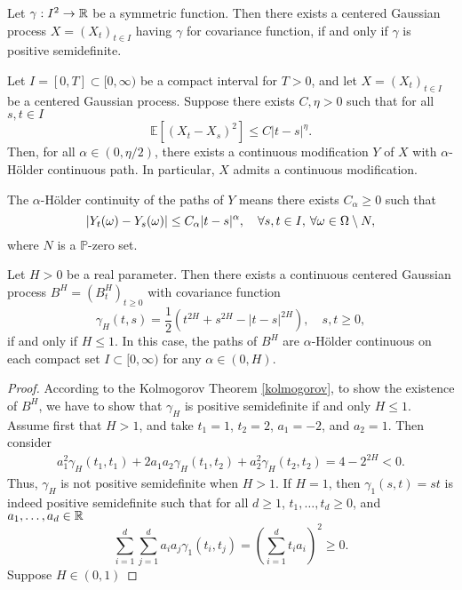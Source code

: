 \begin{thm}\label{kolmogorov}
    Let $\gamma: I^{2}\to\mathbb{R}$ be a symmetric function. Then there exists a centered Gaussian process $X=(X_{t})_{t\in I}$ having $\gamma$ for covariance function, if and only if $\gamma$ is positive semidefinite.
\end{thm}
\begin{lem}
    Let $I=[0,T]\subset [0,\infty)$ be a compact interval for $T>0$, and let $X=(X_{t})_{t\in I}$ be a centered Gaussian process. Suppose there exists $C,\eta>0$ such that for all $s,t\in I$
    \begin{equation}
        \mathbb{E}\left[(X_{t}-X_{s})^{2}\right]\leq C|t-s|^{\eta}.
    \end{equation}
    Then, for all $\alpha\in (0,\eta/2)$, there exists a continuous modification $Y$ of $X$ with $\alpha$-Hölder continuous path. In particular, $X$ admits a continuous modification.
\end{lem}
The $\alpha$-Hölder continuity of the paths of $Y$ means there exists $C_{\alpha}\geq 0$ such that
\begin{equation}
    |Y_{t}(\omega)-Y_{s}(\omega)|\leq C_{\alpha}|t-s|^{\alpha},\quad \forall s,t\in I,\hspace{2 pt}\forall\omega\in\Omega\setminus N,
\end{equation}
where $N$ is a $\mathbb{P}$-zero set.
\begin{thm}
  Let $H>0$ be a real parameter. Then there exists a continuous centered Gaussian process $B^{H}=(B_{t}^{H})_{t\geq 0}$ with covariance function
  \begin{equation}
      \gamma_{H}(t,s)=\frac{1}{2}(t^{2H}+s^{2H}-|t-s|^{2H}), \quad s,t\geq 0,
  \end{equation}
  if and only if $H\leq 1$. In this case, the paths of $B^{H}$ are $\alpha$-Hölder continuous on each compact set $I\subset [0,\infty)$ for any $\alpha\in (0,H)$.
\end{thm}
\begin{proof}
    According to the Kolmogorov Theorem \ref{kolmogorov}, to show the existence of $B^{H}$, we have to show that $\gamma_{H}$ is positive semidefinite if and only $H\leq 1$.
    Assume first that $H>1$, and take $t_{1}=1$, $t_{2}=2$, $a_{1}=-2$, and $a_{2}=1$. Then consider
    \begin{align}
        a_{1}^{2}\gamma_{H}(t_{1},t_{1})+2a_{1}a_{2}\gamma_{H}(t_{1},t_{2})+a_{2}^{2}\gamma_{H}(t_{2},t_{2})=4-2^{2H}<0.
    \end{align}
    Thus, $\gamma_{H}$ is not positive semidefinite when $H>1$. If $H=1$, then $\gamma_{1}(s,t)=st$ is indeed positive semidefinite such that for all $d\geq 1$, $t_{1},\dots,t_{d}\geq 0$, and $a_{1},\dots,a_{d}\in \mathbb{R}$
    \begin{equation}
        \sum_{i=1}^{d}\sum_{j=1}^{d}a_{i}a_{j}\gamma_{1}(t_{i},t_{j})= \left(\sum_{i=1}^{d}t_{i}a_{i}\right)^{2}\geq 0.
    \end{equation}
    Suppose $H\in (0,1)$
\end{proof}

